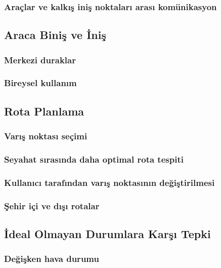 \subsubsection{Araçlar ve kalkış iniş noktaları arası komünikasyon}

\subsection{Araca Biniş ve İniş}

\subsubsection{Merkezi duraklar}
\subsubsection{Bireysel kullanım}

\subsection{Rota Planlama}

\subsubsection{Varış noktası seçimi}
\subsubsection{Seyahat sırasında daha optimal rota tespiti}
\subsubsection{Kullanıcı tarafından varış noktasının değiştirilmesi}
\subsubsection{Şehir içi ve dışı rotalar}

\subsection{İdeal Olmayan Durumlara Karşı Tepki}
\subsubsection{Değişken hava durumu}
